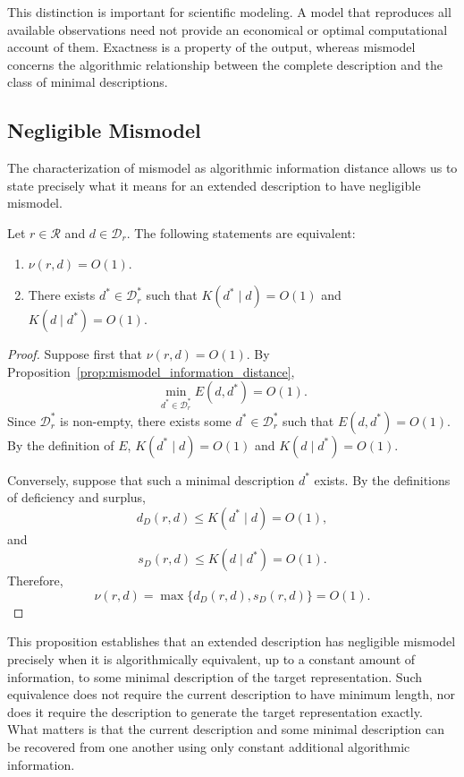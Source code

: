 This distinction is important for scientific modeling. A model that reproduces all available observations need not provide an economical or optimal computational account of them. Exactness is a property of the output, whereas mismodel concerns the algorithmic relationship between the complete description and the class of minimal descriptions.


\subsection*{Negligible Mismodel}

The characterization of mismodel as algorithmic information distance allows us to state precisely what it means for an extended description to have negligible mismodel.

\begin{proposition}
\label{prop:mismodel_equiv_description}
Let $r\in\mathcal R$ and $d\in\mathcal D_r$. The following statements are equivalent:
\begin{enumerate}
\item $\nu(r,d)=O(1)$.
\item There exists $d^\ast\in\mathcal D_r^\ast$ such that $K(d^\ast\mid d)=O(1)$ and $K(d\mid d^\ast)=O(1)$.
\end{enumerate}
\end{proposition}
\begin{proof}
Suppose first that $\nu(r,d)=O(1)$. By Proposition~\ref{prop:mismodel_information_distance},
\[
\min_{d^\ast\in\mathcal D_r^\ast}E(d,d^\ast)=O(1).
\]
Since $\mathcal D_r^\ast$ is non-empty, there exists some $d^\ast\in\mathcal D_r^\ast$ such that $E(d,d^\ast)=O(1)$. By the definition of $E$, $K(d^\ast\mid d)=O(1)$ and $K(d\mid d^\ast)=O(1)$.

Conversely, suppose that such a minimal description $d^\ast$ exists. By the definitions of deficiency and surplus,
\[
d_D(r,d)\le K(d^\ast\mid d)=O(1),
\]
and
\[
s_D(r,d)\le K(d\mid d^\ast)=O(1).
\]
Therefore,
\[
\nu(r,d) = \max\{d_D(r,d),s_D(r,d)\} = O(1).
\]
\end{proof}

This proposition establishes that an extended description has negligible mismodel precisely when it is algorithmically equivalent, up to a constant amount of information, to some minimal description of the target representation. Such equivalence does not require the current description to have minimum length, nor does
it require the description to generate the target representation exactly. What matters is that the current description and some minimal description can be recovered from one another using only constant additional algorithmic information.

